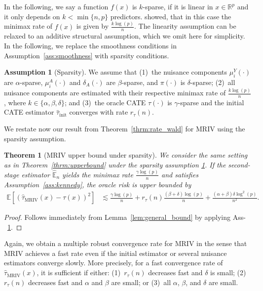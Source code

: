 \documentclass{article} %
\newcommand{\E}{\mathbb{E}}
\newcommand{\R}{\mathbb{R}}
\newcommand{\frameworkname}{MRIV\xspace}
\theoremstyle{definition}
\newtheorem{assumption}{Assumption}
\theoremstyle{plain}
\newtheorem{theorem}{Theorem}
\begin{document}
In the following, we say a function $f(x)$ is $k$-sparse, if it is linear in $x \in \R^p$ and it only depends on $k < \min\{n, p\}$ predictors. \citep{Yang.2015} showed, that in this case the minimax rate of $f(x)$ is given by $\frac{k \log(p)}{n}$. The linearity assumption can be relaxed to an additive structural assumption, which we omit here for simplicity. In the following, we replace the smoothness conditions in Assumption~\ref{ass:smoothness} with sparsity conditions.

\begin{assumption}[Sparsity]\label{ass:sparsity}
We assume that (1)~the nuisance components $\mu_i^Y(\cdot)$ are $\alpha$-sparse, $\mu_i^A(\cdot)$ and $\delta_A(\cdot)$ are $\beta$-sparse, and $\pi(\cdot)$ is $\delta$-sparse; (2)~all nuisance components are estimated with their respective minimax rate of $\frac{k \log(p)}{n}$, where $k \in \{\alpha, \beta, \delta\}$; and (3)~the oracle CATE $\tau(\cdot)$ is $\gamma$-sparse and the initial CATE estimator $\hat{\tau}_{\mathrm{init}}$ converges with rate $r_{\tau}(n)$.
\end{assumption}

We restate now our result from Theorem~\ref{thrm:rate_wald} for \frameworkname using the sparsity assumption.

\begin{theorem}[\frameworkname upper bound under sparsity]\label{thrm:upperbound_sparsity}
We consider the same setting as in Theorem~\ref*{thrm:upperbound} under the sparsity assumption \ref{ass:sparsity}.
If the second-stage estimator $\hat{\E}_n$ yields the minimax rate $\frac{\gamma \log(p)}{n}$ and satisfies Assumption~\ref{ass:kennedy}, the oracle risk is upper bounded by
\begin{equation*}\label{eq:upperbound_mriv_sparsity}
\begin{split}
    \E\left[\left(\hat{\tau}_{\mathrm{MRIV}}(x) - \tau(x)\right)^2\right] & \lesssim  \frac{\gamma \log(p)}{n} + r_{\tau}(n) \frac{(\beta + \delta) \log(p)}{n} + 
    \frac{(\alpha + \beta) \delta \log^2(p)}{n^2}.
\end{split}
\end{equation*}
\end{theorem}
\begin{proof}
Follows immediately from Lemma~\ref{lem:general_bound} by applying Ass-~\ref{ass:sparsity}.
\end{proof}

Again, we obtain a multiple robust convergence rate for \frameworkname in the sense that \frameworkname achieves a fast rate even if the initial estimator or several nuisance estimators converge slowly. More precisely, for a fast convergence rate of $\hat{\tau}_{\mathrm{MRIV}}(x)$, it is sufficient if either: (1)~$r_{\tau}(n)$ decreases fast and $\delta$ is small; (2)~$r_{\tau}(n)$ decreases fast and $\alpha$ and $\beta$ are small; or (3)~all $\alpha$, $\beta$, and $\delta$ are small. 
\end{document}
